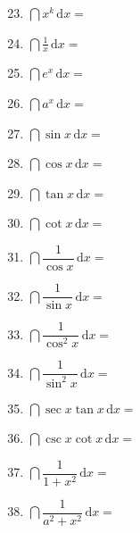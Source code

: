 \documentclass[a4paper,12pt]{article}
\begin{document}
    \begin{minipage}[t]{0.30\textwidth}
        \begin{enumerate}[leftmargin=*, itemsep=1.1em]
            \setcounter{enumi}{22}
            \item $\dint x^k\,\mathrm{d}x =$
            \item $\dint \displaystyle\frac{1}{x}\,\mathrm{d}x =$
            \item $\dint e^x\,\mathrm{d}x =$
            \item $\dint a^x\,\mathrm{d}x =$
            \item $\dint \sin x\,\mathrm{d}x =$
            \item $\dint \cos x\,\mathrm{d}x =$
            \item $\dint \tan x\,\mathrm{d}x =$
            \item $\dint \cot x\,\mathrm{d}x =$
            \item $\dint \dfrac{1}{\cos x}\,\mathrm{d}x =$
            \item $\dint \dfrac{1}{\sin x}\,\mathrm{d}x =$
            \item $\dint \dfrac{1}{\cos^2 x}\,\mathrm{d}x =$
            \item $\dint \dfrac{1}{\sin^2 x}\,\mathrm{d}x =$
            \item $\dint \sec x \tan x\,\mathrm{d}x =$
            \item $\dint \csc x \cot x\,\mathrm{d}x =$
            \item $\dint \dfrac{1}{1 + x^2}\,\mathrm{d}x =$
            \item $\dint \dfrac{1}{a^2 + x^2}\,\mathrm{d}x =$
        \end{enumerate}
    \end{minipage}
    \hfill
\end{document}
